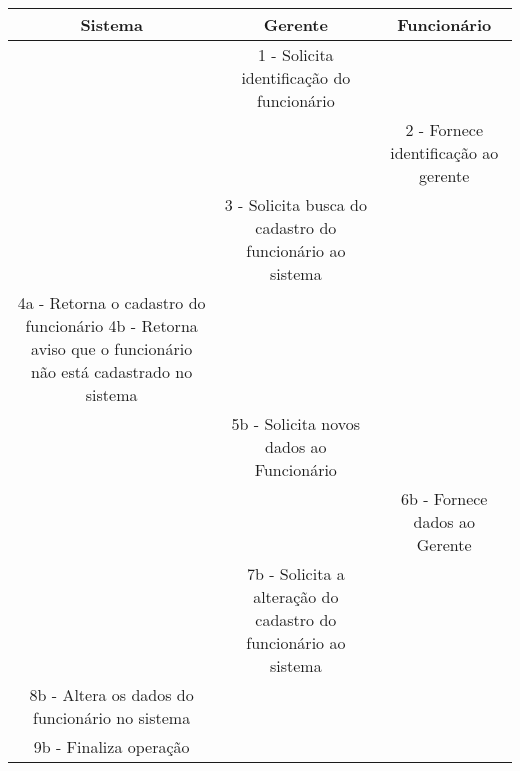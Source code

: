 \begin{table}[H]
	\centering
	\begin{tabulary}{\textwidth}{|C|C|C|} \hline
	Sistema                                        & Gerente                                   & Funcionário                          \\ \hline
	                                               & 1 - Solicita identificação do funcionário &                                      \\ \hline
	                                               &                                           & 2 - Fornece identificação ao gerente \\ \hline
	                                               & 3 - Solicita busca do cadastro do funcionário ao sistema &                       \\ \hline
	4a - Retorna o cadastro do funcionário \newline 4b - Retorna aviso que o funcionário não está cadastrado no sistema &  &          \\ \hline
	                                               & 5b - Solicita novos dados ao Funcionário  &          \\ \hline
	                                               &                                           & 6b - Fornece dados ao Gerente        \\ \hline
	                                               & 7b - Solicita a alteração do cadastro do funcionário ao sistema &                \\ \hline
	8b - Altera os dados do funcionário no sistema &                                           &                                      \\ \hline
	9b - Finaliza operação                         &                                           &                                      \\ \hline
	\end{tabulary}
\end{table}




